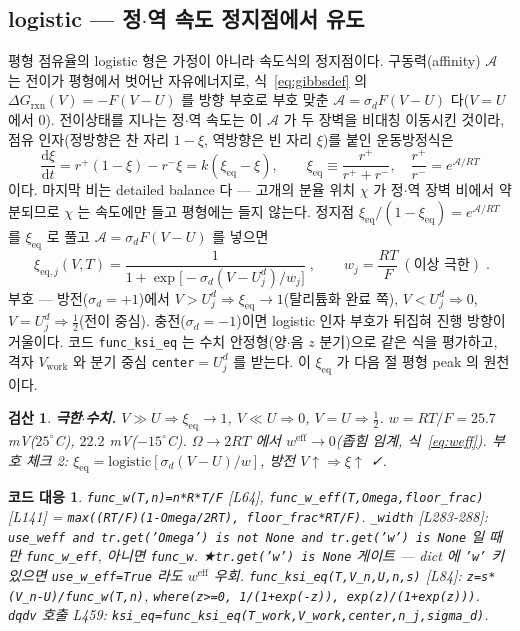 \documentclass[11pt,a4paper]{article}
\newtheorem*{codebox}{코드 대응}
\newtheorem*{verifybox}{검산}
\newcommand{\dd}{\mathrm{d}}
\newcommand{\eff}{\mathrm{eff}}
\newcommand{\eq}{\mathrm{eq}}
\newcommand{\work}{\mathrm{work}}
\newcommand{\sgn}{\sigma_d}
\begin{document}
\subsection{logistic — 정$\cdot$역 속도 정지점에서 유도}
평형 점유율의 logistic 형은 가정이 아니라 속도식의 정지점이다. 구동력(affinity) $\mathcal A$ 는 전이가 평형에서 벗어난 자유에너지로, 식~\eqref{eq:gibbsdef} 의 $\Delta G_{\mathrm{rxn}}(V)=-F(V-U)$ 를 방향 부호로 부호 맞춘 $\mathcal A=\sgn F(V-U)$ 다($V=U$ 에서 $0$). 전이상태를 지나는 정$\cdot$역 속도는 이 $\mathcal A$ 가 두 장벽을 비대칭 이동시킨 것이라, 점유 인자(정방향은 찬 자리 $1-\xi$, 역방향은 빈 자리 $\xi$)를 붙인 운동방정식은
\begin{equation}
\frac{\dd\xi}{\dd t}=r^+(1-\xi)-r^-\xi=k(\xi_\eq-\xi),\qquad
\xi_\eq\equiv\frac{r^+}{r^++r^-},\quad \frac{r^+}{r^-}=e^{\mathcal A/RT}
\label{eq:relax}
\end{equation}
이다. 마지막 비는 detailed balance 다 — 고개의 분율 위치 $\chi$ 가 정$\cdot$역 장벽 비에서 약분되므로 $\chi$ 는 속도에만 들고 평형에는 들지 않는다. 정지점 $\xi_\eq/(1-\xi_\eq)=e^{\mathcal A/RT}$ 를 $\xi_\eq$ 로 풀고 $\mathcal A=\sgn F(V-U)$ 를 넣으면
\begin{equation}
\boxed{\;\xi_{\eq,j}(V,T)=\frac{1}{1+\exp\!\big[-\sgn(V-U_j^d)/w_j\big]}\;,\qquad
w_j=\frac{RT}{F}\ (\text{이상 극한})\;.}
\label{eq:logistic}
\end{equation}
부호 — 방전($\sgn=+1$)에서 $V>U_j^d\Rightarrow\xi_\eq\to1$(탈리튬화 완료 쪽), $V<U_j^d\Rightarrow0$, $V=U_j^d\Rightarrow\tfrac12$(전이 중심). 충전($\sgn=-1$)이면 logistic 인자 부호가 뒤집혀 진행 방향이 거울이다. 코드 \texttt{func\_ksi\_eq} 는 수치 안정형(양$\cdot$음 $z$ 분기)으로 같은 식을 평가하고, 격자 $V_\work$ 와 분기 중심 \texttt{center}$=U_j^d$ 를 받는다. 이 $\xi_\eq$ 가 다음 절 평형 peak 의 원천이다.

\begin{verifybox}
\textbf{극한$\cdot$수치.} $V\gg U\Rightarrow\xi_\eq\to1$, $V\ll U\Rightarrow0$, $V=U\Rightarrow\tfrac12$. $w=RT/F=25.7$ mV($25^\circ$C), $22.2$ mV($-15^\circ$C). $\Omega\to2RT$ 에서 $w^\eff\to0$(좁힘 임계, 식~\eqref{eq:weff}). 부호 체크 2: $\xi_\eq=\mathrm{logistic}[\sgn(V-U)/w]$, 방전 $V\!\uparrow\Rightarrow\xi\!\uparrow$ ✓.
\end{verifybox}

\begin{codebox}
\texttt{func\_w(T,n)=n*R*T/F} [L64], \texttt{func\_w\_eff(T,Omega,floor\_frac)} [L141] = \texttt{max((RT/F)(1-Omega/2RT), floor\_frac*RT/F)}. \texttt{\_width} [L283-288]: \texttt{use\_weff and tr.get('Omega') is not None and tr.get('w') is None} 일 때만 \texttt{func\_w\_eff}, 아니면 \texttt{func\_w}. ★\texttt{tr.get('w') is None} 게이트 — dict 에 \texttt{'w'} 키 있으면 \texttt{use\_w\_eff=True} 라도 $w^\eff$ 우회. \texttt{func\_ksi\_eq(T,V\_n,U,n,s)} [L84]: \texttt{z=s*(V\_n-U)/func\_w(T,n)}, \texttt{where(z>=0, 1/(1+exp(-z)), exp(z)/(1+exp(z)))}. \texttt{dqdv} 호출 L459: \texttt{ksi\_eq=func\_ksi\_eq(T\_work,V\_work,center,n\_j,sigma\_d)}.
\end{codebox}
\end{document}
